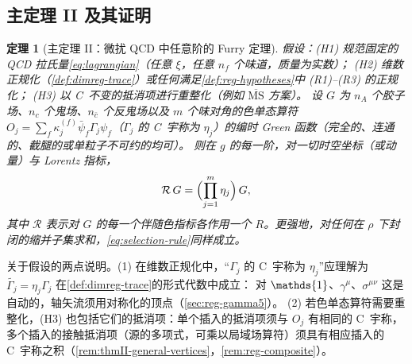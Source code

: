\documentclass[UTF8,a4paper,11pt,fontset=fandol]{ctexart}
\let\amsmathbb\mathbb
\renewcommand{\mathbb}[1]{\ifx1#1\mathds{1}\else\amsmathbb{#1}\fi}
\theoremstyle{cplain}
\newtheorem{theorem}{定理}[section]
\theoremstyle{cdefinition}
\theoremstyle{cremark}
\numberwithin{equation}{section}
\newcommand{\Rop}{\mathcal{R}}                       %
\newcommand{\Cconj}[1]{\widetilde{#1}}              %
\begin{document}
\subsection{主定理 II 及其证明}\label{sec:thmII-main}

\begin{theorem}[主定理 II：微扰 QCD 中任意阶的 Furry 定理]\label{thm:furry-allorders}
假设：(H1) 规范固定的 QCD 拉氏量\cref{eq:lagrangian}（任意 $\xi$，任意 $n_f$ 个味道，质量为实数）；
(H2) 维数正规化（\cref{def:dimreg-trace}）或任何满足\cref{def:reg-hypotheses}中 (R1)--(R3) 的正规化；
(H3) 以 C~不变的抵消项进行重整化（例如 $\overline{\mathrm{MS}}$ 方案）。
设 $G$ 为 $n_A$ 个胶子场、$n_c$ 个鬼场、$n_{\bar c}$ 个反鬼场以及 $m$ 个味对角的色单态算符
$O_j=\sum_f\kappa_j^{(f)}\bar\psi_f\Gamma_j\psi_f$（$\Gamma_j$ 的 C~宇称为 $\eta_j$）的编时 Green 函数（完全的、连通的、截腿的或单粒子不可约的均可）。
则在 $g$ 的每一阶，对一切时空坐标（或动量）与 Lorentz 指标，
\begin{equation}\label{eq:selection-rule}
\Rop\,G=\Bigl(\prod_{j=1}^{m}\eta_j\Bigr)\,G ,
\end{equation}
其中 $\Rop$ 表示对 $G$ 的每一个伴随色指标各作用一个 $R$。更强地，对任何在 $\rho$ 下封闭的缩并子集求和，\cref{eq:selection-rule}同样成立。
\end{theorem}

关于假设的两点说明。(1) 在维数正规化中，“$\Gamma_j$ 的 C~宇称为 $\eta_j$”应理解为 $\Cconj{\Gamma_j}=\eta_j\Gamma_j$ 在\cref{def:dimreg-trace}的形式代数中成立：
对 $\mathbb 1$、$\gamma^\mu$、$\sigma^{\mu\nu}$ 这是自动的，轴矢流须用对称化的顶点（\cref{sec:reg-gamma5}）。
(2) 若色单态算符需要重整化，(H3) 也包括它们的抵消项：单个插入的抵消项须与 $O_j$ 有相同的 C~宇称，
多个插入的接触抵消项（源的多项式，可乘以局域场算符）须具有相应插入的 C~宇称之积（\cref{rem:thmII-general-vertices}，\cref{rem:reg-composite}）。
\end{document}
